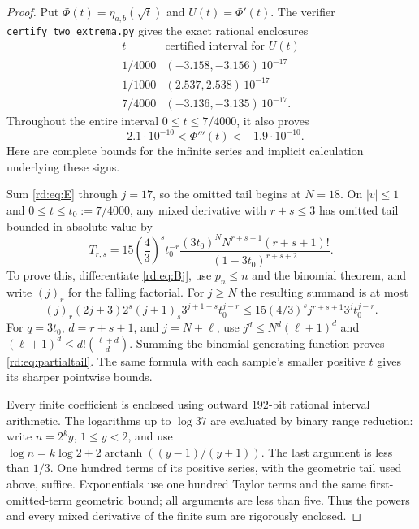 \begin{proof}
Put $\Phi(t)=\eta_{a,b}(\sqrt t)$ and $U(t)=\Phi'(t)$.
The verifier \mbox{\texttt{certify\_two\_extrema.py}} gives the exact
rational enclosures
\[
\begin{array}{c|c}
 t & \text{certified interval for }U(t)\\ \hline
 1/4000 & (-3.158,-3.156)\,10^{-17}\\
 1/1000 & ( 2.537, 2.538)\,10^{-17}\\
 7/4000 & (-3.136,-3.135)\,10^{-17}.
\end{array}
\]
Throughout the entire interval $0\le t\le7/4000$, it also proves
\begin{equation}\label{rd:eq:concavitycertificate}
 -2.1\cdot10^{-10}<\Phi'''(t)<-1.9\cdot10^{-10}.
\end{equation}
Here are complete bounds for the infinite series and implicit
calculation underlying these signs.

Sum \eqref{rd:eq:E} through $j=17$, so the omitted tail begins at
$N=18$. On $|v|\le1$ and $0\le t\le t_0:=7/4000$, any mixed
derivative with $r+s\le3$ has omitted tail bounded in absolute value
by
\begin{equation}\label{rd:eq:partialtail}
 T_{r,s}=15\left(\frac43\right)^s t_0^{-r}
       \frac{(3t_0)^N N^{r+s+1}(r+s+1)!}
            {(1-3t_0)^{r+s+2}}.
\end{equation}
To prove this, differentiate \eqref{rd:eq:Bj}, use $p_n\le n$ and
the binomial theorem, and write $(j)_r$ for the falling factorial.
For $j\ge N$ the resulting summand is at most
\[
 (j)_r(2j+3)2^s(j+1)_s3^{j+1-s}t_0^{j-r}
 \le15(4/3)^s j^{r+s+1}3^jt_0^{j-r}.
\]
For $q=3t_0$, $d=r+s+1$, and $j=N+\ell$, use
$j^d\le N^d(\ell+1)^d$ and
$(\ell+1)^d\le d!\binom{\ell+d}{d}$. Summing the binomial
generating function proves \eqref{rd:eq:partialtail}. The same
formula with each sample's smaller positive $t$ gives its sharper
pointwise bounds.

Every finite coefficient is enclosed using outward $192$-bit rational
interval arithmetic. The logarithms up to $\log37$ are evaluated by
binary range reduction: write $n=2^k y$, $1\le y<2$, and use
$\log n=k\log2+2\operatorname{arctanh}((y-1)/(y+1))$.
The last argument is less than $1/3$. One hundred terms of its positive
series, with the geometric tail used above, suffice. Exponentials use
one hundred Taylor terms and the same first-omitted-term geometric
bound; all arguments are less than five. Thus the powers and every
mixed derivative of the finite sum are rigorously enclosed.


\end{proof}
